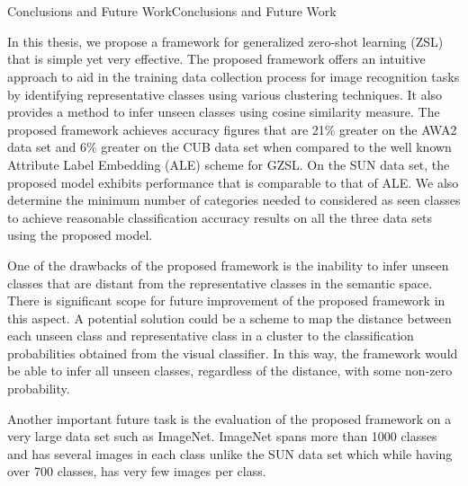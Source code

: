 \chapter{}{Conclusions and Future Work}{Conclusions and Future Work}

In this thesis, we propose a framework for generalized zero-shot learning (ZSL) that is simple yet very effective. The proposed framework offers an intuitive approach to aid in the training data collection process for image recognition tasks by identifying representative classes using various clustering techniques. It also  provides a method to infer unseen classes using cosine similarity measure. The proposed framework achieves accuracy figures that are 21\% greater on the AWA2 data set and 6\% greater on the CUB data set when compared to the well known Attribute Label Embedding (ALE) scheme for GZSL. On the SUN data set, the proposed model exhibits performance that is comparable to that of ALE. We also determine the minimum number of categories needed to considered as seen classes to achieve reasonable classification accuracy results on all the three data sets using the proposed model.

\par
\medskip

One of the drawbacks of the proposed framework is the inability to infer unseen classes that are distant from the representative classes in the semantic space. There is significant scope for future improvement of the proposed framework in this aspect. A potential solution could be a scheme to map the distance between each unseen class and representative class in a cluster to the classification probabilities obtained from the visual classifier. In this way, the framework would be able to infer all unseen classes, regardless of the distance, with some non-zero probability.

\par
\medskip

Another important future task is the evaluation of the proposed framework on a very large data set such as ImageNet. ImageNet spans more than 1000 classes and has several images in each class unlike the SUN data set which while having over 700 classes, has very few images per class.

\newpage